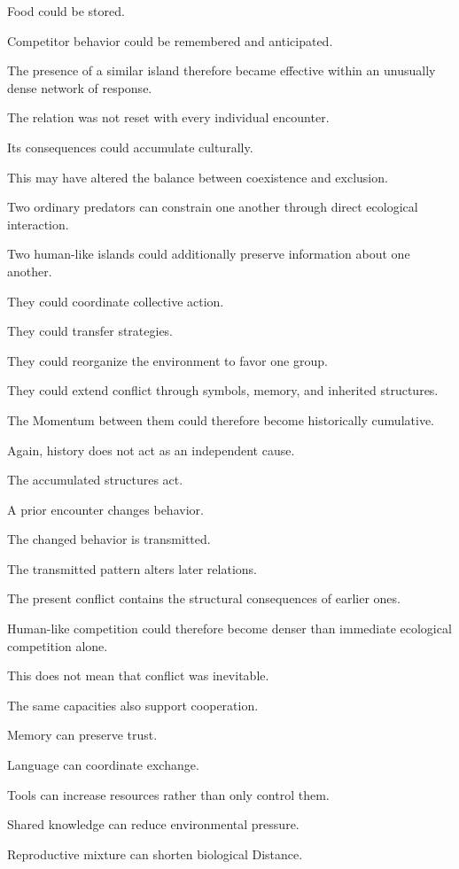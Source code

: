 Food could be stored.

Competitor behavior could be remembered and anticipated.

The presence of a similar island therefore became effective within an unusually dense network of response.

The relation was not reset with every individual encounter.

Its consequences could accumulate culturally.

This may have altered the balance between coexistence and exclusion.

Two ordinary predators can constrain one another through direct ecological interaction.

Two human-like islands could additionally preserve information about one another.

They could coordinate collective action.

They could transfer strategies.

They could reorganize the environment to favor one group.

They could extend conflict through symbols, memory, and inherited structures.

The Momentum between them could therefore become historically cumulative.

Again, history does not act as an independent cause.

The accumulated structures act.

A prior encounter changes behavior.

The changed behavior is transmitted.

The transmitted pattern alters later relations.

The present conflict contains the structural consequences of earlier ones.

Human-like competition could therefore become denser than immediate ecological competition alone.

This does not mean that conflict was inevitable.

The same capacities also support cooperation.

Memory can preserve trust.

Language can coordinate exchange.

Tools can increase resources rather than only control them.

Shared knowledge can reduce environmental pressure.

Reproductive mixture can shorten biological Distance.

